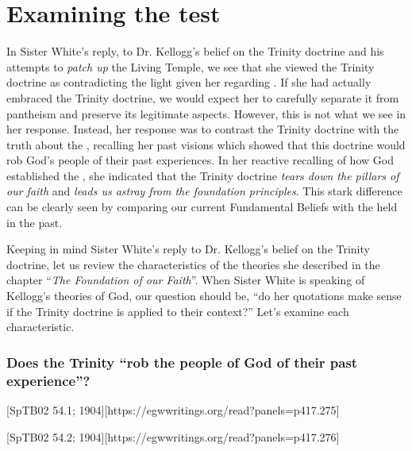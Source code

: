 \chapter{Examining the test}

In Sister White's reply, to Dr. Kellogg's belief on the Trinity doctrine and his attempts to \textit{patch up} the Living Temple, we see that she viewed the Trinity doctrine as contradicting the light given her regarding . If she had actually embraced the Trinity doctrine, we would expect her to carefully separate it from pantheism and preserve its legitimate aspects. However, this is not what we see in her response. Instead, her response was to contrast the Trinity doctrine with the truth about the , recalling her past visions which showed that this doctrine would rob God's people of their past experiences. In her reactive recalling of how God established the , she indicated that the Trinity doctrine \textit{tears down the pillars of our faith} and \textit{leads us astray from the foundation principles}. This stark difference can be clearly seen by comparing our current Fundamental Beliefs with the  held in the past.

Keeping in mind Sister White’s reply to Dr. Kellogg's belief on the Trinity doctrine, let us review the characteristics of the theories she described in the chapter “\textit{The Foundation of our Faith}”. When Sister White is speaking of Kellogg’s theories of God, our question should be, “do her quotations make sense if the Trinity doctrine is applied to their context?” Let’s examine each characteristic.

\subsection*{Does the Trinity “rob the people of God of their past experience”?}

[SpTB02 54.1; 1904][https://egwwritings.org/read?panels=p417.275]

[SpTB02 54.2; 1904][https://egwwritings.org/read?panels=p417.276]

